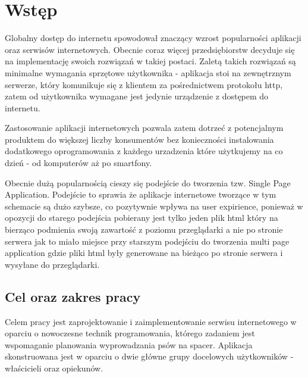 \chapter{Wstęp}
Globalny dostęp do internetu spowodował znaczący wzrost popularności aplikacji oraz serwisów internetowych. Obecnie coraz więcej przedsiębiorstw decyduje się na implementację swoich rozwiązań w takiej postaci. Zaletą takich rozwiązań są minimalne wymagania sprzętowe użytkownika - aplikacja stoi na zewnętrznym serwerze, który komunikuje się z klientem za pośrednictwem protokołu http, zatem od użytkownika wymagane jest jedynie urządzenie z dostępem do internetu. 

Zastosowanie aplikacji internetowych pozwala zatem dotrzeć z potencjalnym produktem do większej liczby konsumentów bez konieczności instalowania dodatkowego oprogramowania z każdego urzadzenia które użytkujemy na co dzień - od komputerów aż po smartfony. 

Obecnie dużą popularnością cieszy się podejście do tworzenia tzw. Single Page Application. Podejście to sprawia że aplikacje internetowe tworzące w tym schemacie są dużo szybsze, co pozytywnie wpływa na user expirience, ponieważ w opozycji do starego podejścia pobierany jest tylko jeden plik html który na bierząco podmienia swoją zawartość z poziomu przeglądarki a nie po stronie serwera jak to miało miejsce przy starszym podejściu do tworzenia multi page application gdzie pliki html były generowane na bieżąco po stronie serwera i wysyłane do przeglądarki.

\section{Cel oraz zakres pracy}
Celem pracy jest zaprojektowanie i zaimplementowanie serwisu internetowego w oparciu o  nowoczesne technik programowania, którego zadaniem jest wspomaganie planowania wyprowadzania psów na spacer. Aplikacja skonstruowana jest w oparciu o dwie główne grupy docelowych użytkowników - właścicieli oraz opiekunów. 


